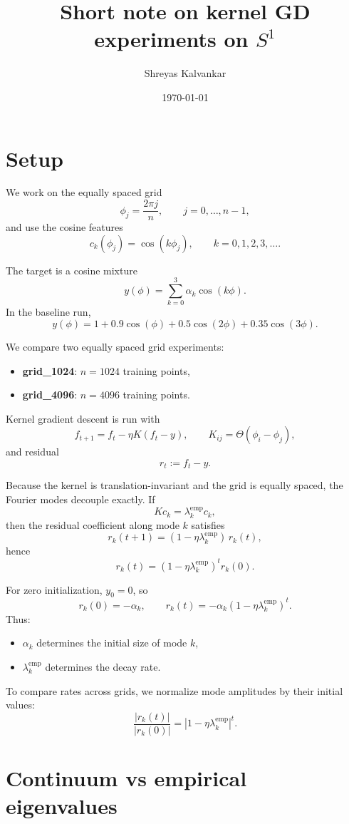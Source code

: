 \documentclass[11pt]{article}
\title{Short note on kernel GD experiments on $S^1$}
\author{Shreyas Kalvankar}
\date{\today}
\begin{document}
\maketitle

\section*{Setup}

We work on the equally spaced grid
\[
	\phi_j = \frac{2\pi j}{n}, \qquad j=0,\dots,n-1,
\]
and use the cosine features
\[
	c_k(\phi_j) = \cos(k\phi_j), \qquad k=0,1,2,3,\dots.
\]

The target is a cosine mixture
\[
	y(\phi)
	=
	\sum_{k=0}^3 \alpha_k \cos(k\phi).
\]
In the baseline run,
\[
	y(\phi)
	=
	1 + 0.9\cos(\phi) + 0.5\cos(2\phi) + 0.35\cos(3\phi).
\]

We compare two equally spaced grid experiments:
\begin{itemize}
	\item \textbf{grid\_1024}: $n=1024$ training points,
	\item \textbf{grid\_4096}: $n=4096$ training points.
\end{itemize}

Kernel gradient descent is run with
\[
	f_{t+1} = f_t - \eta K (f_t-y),
	\qquad
	K_{ij}=\Theta(\phi_i-\phi_j),
\]
and residual
\[
	r_t := f_t-y.
\]

Because the kernel is translation-invariant and the grid is equally spaced, the Fourier modes decouple exactly. If
\[
	K c_k = \lambda_k^{\mathrm{emp}} c_k,
\]
then the residual coefficient along mode $k$ satisfies
\[
	r_k(t+1) = (1-\eta\lambda_k^{\mathrm{emp}})\,r_k(t),
\]
hence
\[
	r_k(t)=(1-\eta\lambda_k^{\mathrm{emp}})^t r_k(0).
\]

For zero initialization, $y_0=0$, so
\[
	r_k(0)=-\alpha_k,
	\qquad
	r_k(t)=-\alpha_k(1-\eta\lambda_k^{\mathrm{emp}})^t.
\]
Thus:
\begin{itemize}
	\item $\alpha_k$ determines the initial size of mode $k$,
	\item $\lambda_k^{\mathrm{emp}}$ determines the decay rate.
\end{itemize}

To compare rates across grids, we normalize mode amplitudes by their initial values:
\[
	\frac{|r_k(t)|}{|r_k(0)|} = |1-\eta\lambda_k^{\mathrm{emp}}|^t.
\]

\section*{Continuum vs empirical eigenvalues}
\end{document}
